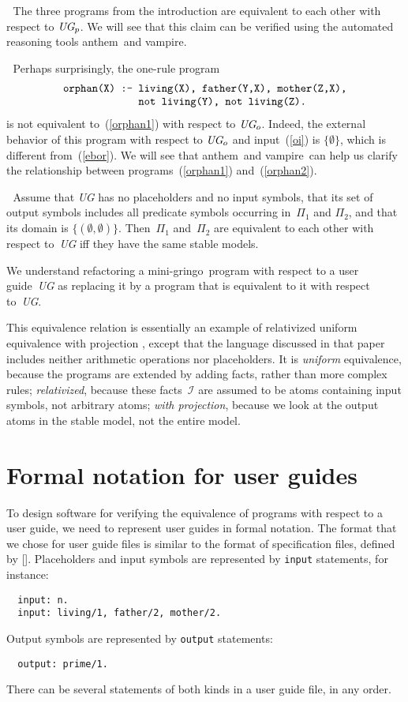 \documentclass{article}
\def\beq{\begin{equation}}
\def\eeq#1{\label{#1}\end{equation}}
\def\ba{\begin{array}}
\def\ea{\end{array}}
\def\gringo{{\sc gringo}}
\def\anthem{{\sc anthem}}
\def\vampire{{\sc vampire}}
\newcommand{\I}{\mathcal{I}}
\begin{document}
\medskip{}$\;$ The three programs from the
introduction are equivalent to each other with respect to $\emph{UG}_p$.
We will see that this claim can be verified using the automated reasoning
tools \anthem\ and \vampire.

\medskip{}$\;$ Perhaps surprisingly,
the one-rule program
\beq\ba l
\verb|orphan(X) :- living(X), father(Y,X), mother(Z,X),|\\
\verb|             not living(Y), not living(Z).|
\ea\eeq{orphan2}
is not equivalent to~(\ref{orphan1}) with respect to $\emph{UG}_o$.
Indeed, the external behavior of this program with respect
to $\emph{UG}_o$ and input~(\ref{oi}) is $\{\emptyset\}$, which
is different from~(\ref{ebor}).  We will see
that \anthem\ and \vampire\ can help us clarify the relationship between
programs~(\ref{orphan1}) and~(\ref{orphan2}).

\medskip{}$\;$
Assume that \emph{UG} has no placeholders and no input symbols,
that its set of output symbols includes all predicate symbols occurring
in~$\Pi_1$ and $\Pi_2$, and that its domain is $\{(\emptyset,\emptyset)\}$.
Then~$\Pi_1$ and~$\Pi_2$ are equivalent to each other with
respect to~\emph{UG} iff they have the same stable models.

\medskip
We understand refactoring a mini-\gringo\ program with respect to a
  user guide~\emph{UG} as replacing it by a program that is equivalent
  to it with respect to~\emph{UG}.

This equivalence relation is essentially an
example of relativized uniform equivalence with projection
\cite{oet08}, except that the language discussed in that paper includes
neither arithmetic operations nor placeholders.
It is \emph{uniform} equivalence, because the programs are extended by
adding facts, rather than more complex rules; \emph{relativized},
because these
  facts~$\I$ are assumed to be atoms containing input symbols,
  not arbitrary atoms; \emph{with projection}, because
  we look at the output atoms in the stable model, not the entire model.

\section{Formal notation for user guides} \label{sec:fn}

To design software for verifying the equivalence of
programs with respect to a user guide, we need to
represent user guides in formal notation.   The format that we chose for
user guide files is similar to the format of
specification files, defined by \citeauthor{fan20} [\citeyear{fan20}].
Placeholders
and input symbols are represented by \verb|input| statements, for instance:
\begin{verbatim}
  input: n.
  input: living/1, father/2, mother/2.
\end{verbatim}
Output symbols are represented by \verb|output| statements:
\begin{verbatim}
  output: prime/1.
\end{verbatim}
There can be several statements of both kinds in a user guide file, in any
order.
\end{document}
